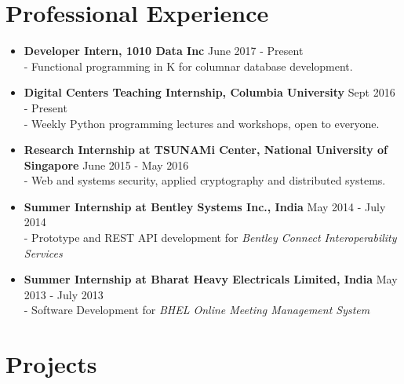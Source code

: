 \documentclass{article}
\begin{document}
\section*{Professional Experience}
\begin{itemize}
    \item \textbf{Developer Intern, 1010 Data Inc} {\hfill June 2017 - Present}\\
    - Functional programming in K for columnar database development.

    \item \textbf{Digital Centers Teaching Internship, Columbia University} {\hfill Sept 2016 - Present}\\
    - Weekly Python programming lectures and workshops, open to everyone.

    \item \textbf{Research Internship at TSUNAMi Center, National University of Singapore} {\hfill June 2015 - May 2016}\\
    - Web and systems security, applied cryptography and distributed systems.
    
    \item \textbf{Summer Internship at Bentley Systems Inc., India} {\hfill May 2014 - July 2014}\\
    - Prototype and REST API development for \textit{Bentley Connect Interoperability Services}

    \item \textbf{Summer Internship at Bharat Heavy Electricals Limited, India} {\hfill May 2013 - July 2013}\\
    - Software Development for \textit{BHEL Online Meeting Management System}
\end{itemize}

\section*{Projects}
\end{document}
